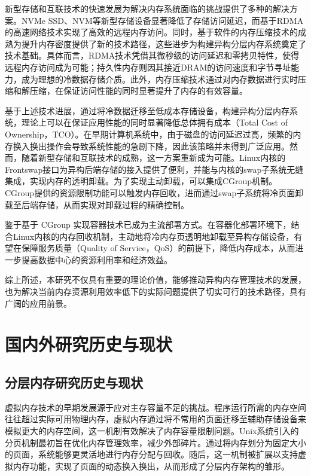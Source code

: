 新型存储和互联技术的快速发展为解决内存系统面临的挑战提供了多种的解决方案。NVMe SSD、NVM等新型存储设备显著降低了存储访问延迟，而基于RDMA的高速网络技术实现了高效的远程内存访问。同时，基于软件的内存压缩技术的成熟为提升内存密度提供了新的技术路径，这些进步为构建异构分层内存系统奠定了技术基础。具体而言，RDMA技术凭借其微秒级的访问延迟和零拷贝特性，使得远程内存访问成为可能；持久性内存则因其接近DRAM的访问速度和字节寻址能力，成为理想的冷数据存储介质。此外，内存压缩技术通过对内存数据进行实时压缩和解压缩，在保证访问性能的同时显著提升了内存的有效容量。

基于上述技术进展，通过将冷数据迁移至低成本存储设备，构建异构分层内存系统，理论上可以在保证应用性能的同时显著降低总体拥有成本（Total Cost of Ownership，TCO）。在早期计算机系统中，由于磁盘的访问延迟过高，频繁的内存换入换出操作会导致系统性能的急剧下降，因此该策略并未得到广泛应用。然而，随着新型存储和互联技术的成熟，这一方案重新成为可能。Linux内核的Frontswap接口为异构后端存储的接入提供了便利，并能与内核的swap子系统无缝集成，实现内存的透明卸载。为了实现主动卸载，可以集成CGroup机制。CGroup提供的资源限制功能可以触发内存回收，进而通过swap子系统将冷页面卸载至后端存储，从而实现对卸载过程的精确控制。

鉴于基于 CGroup 实现容器技术已成为主流部署方式。在容器化部署环境下，结合Linux内核的内存回收机制，主动地将冷内存页透明地卸载至异构存储设备，有望在保障服务质量（Quality of Service，QoS）的前提下，降低内存成本，从而进一步提高数据中心的资源利用率和经济效益。

综上所述，本研究不仅具有重要的理论价值，能够推动异构内存管理技术的发展，也为解决当前内存资源利用效率低下的实际问题提供了切实可行的技术路径，具有广阔的应用前景。

\section{国内外研究历史与现状}

\subsection{分层内存研究历史与现状}

虚拟内存技术的早期发展源于应对主存容量不足的挑战。程序运行所需的内存空间往往超过实际可用物理内存，虚拟内存通过将不常用的页面迁移至辅助存储设备来模拟更大的内存空间，这一机制有效解决了内存容量限制问题。Unix系统引入的分页机制最初旨在优化内存管理效率，减少外部碎片。通过将内存划分为固定大小的页面，系统能够更灵活地进行内存分配与回收。随后，这一机制被扩展以支持虚拟内存功能，实现了页面的动态换入换出，从而形成了分层内存架构的雏形。

